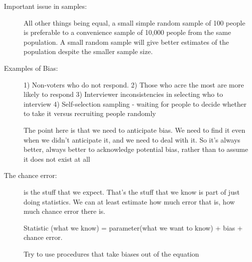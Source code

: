 \documentclass[10pt,landscape]{article}
\begin{document}
\begin{multicols}{3}
\begin{description}
\item[Important issue in samples:] All other things being equal, a small simple random sample of 100 people is preferable to a convenience sample of 10,000 people from the same population. A small random sample will give better estimates of the population despite the smaller sample size.\\
\item[Examples of Bias:] 1) Non-voters who do not respond. 2) Those who acre the most are more likely to respond 3) Interviewer inconsistencies in selecting who to interview 4) Self-selection sampling - waiting for people to decide whether to take it versus recruiting people randomly

The point here is that we need to anticipate bias. We need to find it even when we didn't anticipate it, and we need to deal with it. So it's always better, always better to acknowledge potential bias, rather than to assume it does not exist at all

\item[The chance error:] is the stuff that we expect. That's the stuff that we know is part of just doing statistics. We can at least estimate how much error that is, how much chance error there is.

Statistic (what we know) = parameter(what we want to know) + bias + chance error.

Try to use procedures that take biases out of the equation


\end{description}
\end{multicols}
\end{document}
